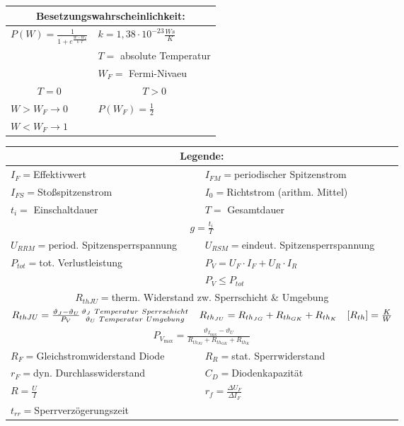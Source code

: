     \begin{table}[H]
        \begin{tabularx}{\columnwidth}{|X|X|}
            \hline
            \multicolumn{2}{|c|}{\textbf{Besetzungswahrscheinlichkeit:}}\\
            \hline
            $P(W)=\frac{1}{1+e^{\frac{W-W_F}{k\cdot T}}}$ & $k=1,38\cdot 10^{-23}\frac{Ws}{K}$ \\
            & $T=$ absolute Temperatur \\
            & $W_F=$ Fermi-Nivaeu \\
            \hline
            \multicolumn{1}{|c|}{$T=0$} & \multicolumn{1}{c|}{$T>0$} \\
            $W>W_F\rightarrow 0$ & $P(W_F)=\frac{1}{2}$\\
            $W<W_F\rightarrow 1$ & \\
            \hline
        \end{tabularx}
    \end{table}
    \begin{table}[H]
        \begin{tabularx}{\textwidth}{|X X|}
            \hline
            \multicolumn{2}{|c|}{\textbf{Legende:}}\\
            \hline
            $I_F=$Effektivwert & $I_{FM}=$periodischer Spitzenstrom \\
            $I_{FS}=$Stoßspitzenstrom & $I_0=$Richtstrom (arithm. Mittel)\\
            $t_i=$ Einschaltdauer & $T=$ Gesamtdauer \\
            \multicolumn{2}{|c|}{$g=\frac{t_i}{T}$}\\
            $U_{RRM}=$period. Spitzensperrspannung & $U_{RSM}=$eindeut. Spitzensperrspannung \\
            $P_{tot}=$tot. Verlustleistung & $P_V=U_F\cdot I_F + U_R\cdot I_R$ \\
            & $P_V\leq P_{tot}$ \\
            \multicolumn{2}{|c|}{$R_{th JU}=$therm. Widerstand zw. Sperrschicht \& Umgebung}\\
            \multicolumn{2}{|c|}{$R_{th JU}=\frac{\vartheta_J-\vartheta_U}{P_V} \bfrac{\vartheta_J\ Temperatur\ Sperrschicht}{\vartheta_U\ Temperatur\ Umgebung}\quad R_{th_{JU}}=R_{th_{JG}}+R_{th_{GK}}+R_{th_{K}}\quad [R_{th}]=\frac{K}{W}$}\\
            \multicolumn{2}{|c|}{$P_{V_{\max}}=\frac{\vartheta_{I_{\max}}-\vartheta_U}{R_{th_{JG}}+R_{th_{GK}}+R_{th_{K}}}$}\\
            $R_F=$Gleichstromwiderstand Diode & $R_R=$stat. Sperrwiderstand \\
            $r_F=$dyn. Durchlasswiderstand & $C_D=$Diodenkapazität \\
            $R=\frac{U}{I}$ & $r_f=\frac{\Delta U_F}{\Delta I_F}$ \\
            $t_{rr}=$Sperrverzögerungszeit & \\
            \hline
        \end{tabularx}
    \end{table}


